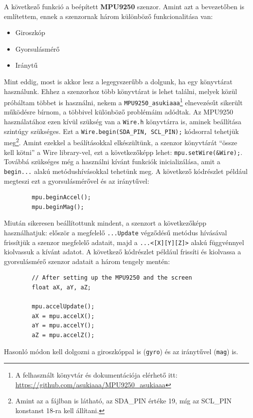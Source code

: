 \documentclass[12pt,a4paper]{article}
\begin{document}
      A következő funkció a beépített \textbf{MPU9250} szenzor. Amint azt a bevezetőben is említettem, ennek a szenzornak három különböző funkcionalitása van:
      \begin{itemize}
        \item Giroszkóp
        \item Gyorsulásmérő
        \item Iránytű
      \end{itemize}
      Mint eddig, most is akkor lesz a legegyszerűbb a dolgunk, ha egy könyvtárat használunk. Ehhez a szenzorhoz több könyvtárat is lehet találni, melyek közül próbáltam többet is használni, nekem a \texttt{MPU9250\_asukiaaa}\footnote{A felhasznált könyvtár és dokumentációja elérhető itt: \url{https://github.com/asukiaaa/MPU9250\_asukiaaa}} elnevezésűt sikerült működésre bírnom, a többivel különböző problémáim adódtak.
      Az MPU9250 használatához ezen kívül szükség van a \texttt{Wire.h} könyvtárra is, aminek beállítása szintúgy szükséges. Ezt a \texttt{Wire.begin(SDA\_PIN, SCL\_PIN);} kódsorral tehetjük meg\footnote{Amint az a fájlban is látható, az SDA\_PIN értéke 19, míg az SCL\_PIN konstanst 18-ra kell állítani.}. Amint ezekkel a beálításokkal elkészültünk, a szenzor könyvtárát ``össze kell kötni'' a Wire library-vel, ezt a következőképp lehet: \texttt{mpu.setWire(\&Wire);}. Továbbá szükséges még a használni kívánt funkciók inicializálása, amit a \texttt{begin...} alakú metódushívásokkal tehetünk meg. A következő kódrészlet például megteszi ezt a gyorsulásmérővel és az iránytűvel:
      \begin{lstlisting}
        mpu.beginAccel();
        mpu.beginMag();
      \end{lstlisting}
      Miután sikeresen beállítottunk mindent, a szenzort a következőképp használhatjuk: először a megfelelő \texttt{...Update} végződésű metódus hívásával frissítjük a szenzor megfelelő adatait, majd a \texttt{...<[X][Y][Z]>} alakú függvénnyel kiolvassuk a kívánt adatot.
      A következő kódrészlet például frissíti és kiolvassa a gyorsulásmérő szenzor adatait a három tengely mentén:
      \begin{lstlisting}
        // After setting up the MPU9250 and the screen
        float aX, aY, aZ;

        mpu.accelUpdate();
        aX = mpu.accelX();
        aY = mpu.accelY();
        aZ = mpu.accelZ();
      \end{lstlisting}
      Hasonló módon kell dolgozni a giroszkóppal is (\texttt{gyro}) és az iránytűvel (\texttt{mag}) is.
\end{document}
